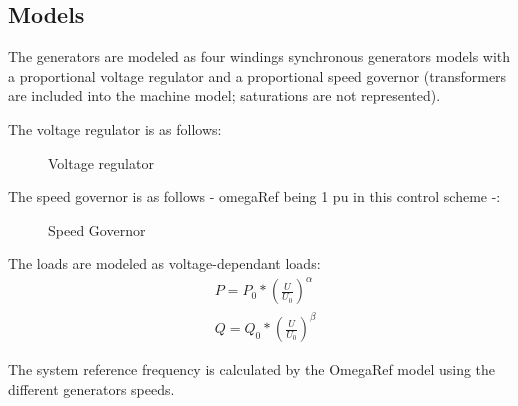 \documentclass[a4paper, 12pt]{report}
\begin{document}
\subsection{Models}

The generators are modeled as four windings synchronous generators models with a proportional voltage regulator and a proportional speed governor (transformers are included into the machine model; saturations are not represented).

The voltage regulator is as follows:
\begin{figure}[H]
\centering
{}
\caption{Voltage regulator}
\end{figure}

The speed governor is as follows - omegaRef being 1 pu in this control scheme -:
\begin{figure}[H]
\centering
{}
\caption{Speed Governor}
\end{figure}

The loads are modeled as voltage-dependant loads:
\begin{equation*}
\begin{aligned}
& P = P_{0} * (\frac{U}{U_{0}})^\alpha \\
& Q = Q_{0} * (\frac{U}{U_{0}})^\beta
\end{aligned}
\label{Voltage-dependant load model}
\end{equation*}

The system reference frequency is calculated by the OmegaRef model using the different generators speeds.\\
\end{document}
